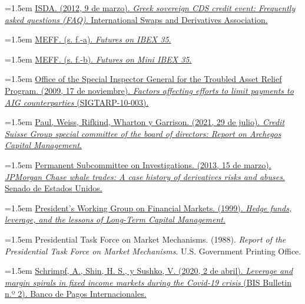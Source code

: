 \documentclass[10pt,a4paper]{article}
\begin{document}
\noindent\hangindent=1.5em \href{https://www.isda.org/a/p0EDE/greek-sovereign-cds-credit-event-faqs-03-09.pdf}{ISDA. (2012, 9 de marzo). \textit{Greek sovereign CDS credit event: Frequently asked questions (FAQ)}. International Swaps and Derivatives Association.}

\noindent\hangindent=1.5em \href{https://www.meff.es/ing/Financial-Derivatives/Futures-on-IBEX35}{MEFF. (s. f.-a). \textit{Futures on IBEX 35}.}

\noindent\hangindent=1.5em \href{https://meff.es/ing/Financial-Derivatives/Futures-on-Mini-IBEX35}{MEFF. (s. f.-b). \textit{Futures on Mini IBEX 35}.}

\noindent\hangindent=1.5em \href{https://fraser.stlouisfed.org/title/factors-affecting-efforts-limit-payments-aig-counterparties-5111}{Office of the Special Inspector General for the Troubled Asset Relief Program. (2009, 17 de noviembre). \textit{Factors affecting efforts to limit payments to AIG counterparties} (SIGTARP-10-003).}

\noindent\hangindent=1.5em \href{https://www.sec.gov/comments/s7-32-10/s73210-20113776-265983.pdf}{Paul, Weiss, Rifkind, Wharton y Garrison. (2021, 29 de julio). \textit{Credit Suisse Group special committee of the board of directors: Report on Archegos Capital Management}.}

\noindent\hangindent=1.5em \href{https://www.hsgac.senate.gov/subcommittees/investigations/rep/senate-investigations-subcommittee-holds-hearing-and-releases-report-on-jpmorgan-chase-whale-trades/}{Permanent Subcommittee on Investigations. (2013, 15 de marzo). \textit{JPMorgan Chase whale trades: A case history of derivatives risks and abuses}. Senado de Estados Unidos.}

\noindent\hangindent=1.5em \href{https://www.cftc.gov/sites/default/files/tm/tmhedgefundreport.htm}{President's Working Group on Financial Markets. (1999). \textit{Hedge funds, leverage, and the lessons of Long-Term Capital Management}.}

\noindent\hangindent=1.5em Presidential Task Force on Market Mechanisms. (1988). \textit{Report of the Presidential Task Force on Market Mechanisms}. U.S. Government Printing Office.

\noindent\hangindent=1.5em \href{https://www.bis.org/publ/bisbull02.htm}{Schrimpf, A., Shin, H. S., y Sushko, V. (2020, 2 de abril). \textit{Leverage and margin spirals in fixed income markets during the Covid-19 crisis} (BIS Bulletin n.º 2). Banco de Pagos Internacionales.}
\end{document}
